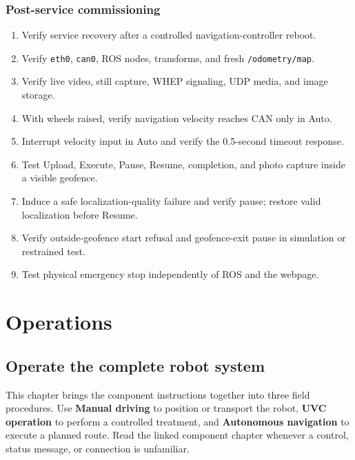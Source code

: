 \documentclass[
  10pt,
  letterpaper,
  openany]{report}
\providecommand{\tightlist}{%
  \setlength{\itemsep}{0pt}\setlength{\parskip}{0pt}}
\begin{document}
\subsection{Post-service
commissioning}\label{post-service-commissioning}

\begin{enumerate}
\tightlist
\item
  Verify service recovery after a controlled navigation-controller
  reboot.
\item
  Verify \texttt{eth0}, \texttt{can0}, ROS nodes, transforms, and fresh
  \texttt{/odometry/map}.
\item
  Verify live video, still capture, WHEP signaling, UDP media, and image
  storage.
\item
  With wheels raised, verify navigation velocity reaches CAN only in
  Auto.
\item
  Interrupt velocity input in Auto and verify the 0.5-second timeout
  response.
\item
  Test Upload, Execute, Pause, Resume, completion, and photo capture
  inside a visible geofence.
\item
  Induce a safe localization-quality failure and verify pause; restore
  valid localization before Resume.
\item
  Verify outside-geofence start refusal and geofence-exit pause in
  simulation or restrained test.
\item
  Test physical emergency stop independently of ROS and the webpage.
\end{enumerate}

\chapter{Operations}\label{operations}

\protect{}\label{operations}
\protect{}\label{workflow}{}

\section{Operate the complete robot
system}\label{operate-the-complete-robot-system}

This chapter brings the component instructions together into three field
procedures. Use \textbf{Manual driving} to position or transport the
robot, \textbf{UVC operation} to perform a controlled treatment, and
\textbf{Autonomous navigation} to execute a planned route. Read the
linked component chapter whenever a control, status message, or
connection is unfamiliar.
\end{document}
